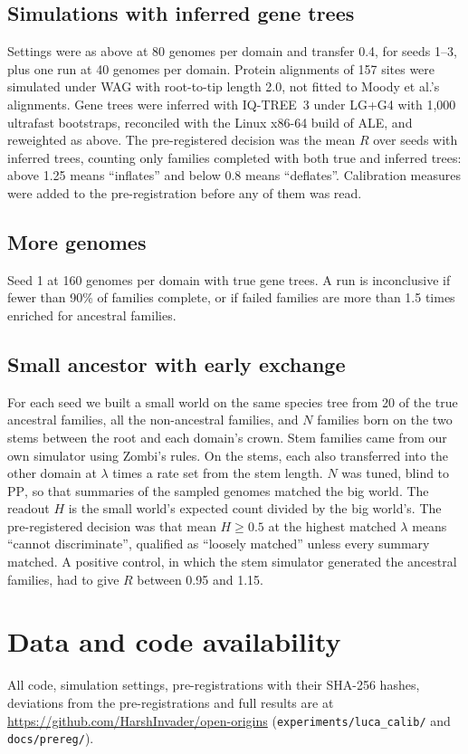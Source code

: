 \documentclass[11pt]{article}
\newcommand{\PP}{\mathrm{PP}}
\begin{document}
\subsection{Simulations with inferred gene trees}
Settings were as above at 80 genomes per domain and transfer 0.4, for seeds 1--3, plus one run at 40 genomes per domain. Protein alignments of 157 sites were simulated under WAG with root-to-tip length 2.0, not fitted to Moody et al.'s alignments. Gene trees were inferred with IQ-TREE~3 under LG+G4 with 1,000 ultrafast bootstraps, reconciled with the Linux x86-64 build of ALE, and reweighted as above. The pre-registered decision was the mean $R$ over seeds with inferred trees, counting only families completed with both true and inferred trees: above 1.25 means ``inflates'' and below 0.8 means ``deflates''. Calibration measures were added to the pre-registration before any of them was read.

\subsection{More genomes}
Seed 1 at 160 genomes per domain with true gene trees. A run is inconclusive if fewer than 90\% of families complete, or if failed families are more than 1.5 times enriched for ancestral families.

\subsection{Small ancestor with early exchange}
For each seed we built a small world on the same species tree from 20 of the true ancestral families, all the non-ancestral families, and $N$ families born on the two stems between the root and each domain's crown. Stem families came from our own simulator using Zombi's rules. On the stems, each also transferred into the other domain at $\lambda$ times a rate set from the stem length. $N$ was tuned, blind to $\PP$, so that summaries of the sampled genomes matched the big world. The readout $H$ is the small world's expected count divided by the big world's. The pre-registered decision was that mean $H \ge 0.5$ at the highest matched $\lambda$ means ``cannot discriminate'', qualified as ``loosely matched'' unless every summary matched. A positive control, in which the stem simulator generated the ancestral families, had to give $R$ between 0.95 and 1.15.

\section*{Data and code availability}
\sloppy All code, simulation settings, pre-registrations with their SHA-256 hashes, deviations from the pre-registrations and full results are at \url{https://github.com/HarshInvader/open-origins} (\texttt{experiments/luca\_calib/} and \texttt{docs/prereg/}).
\end{document}
